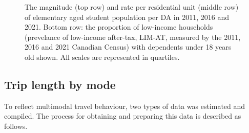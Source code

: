 \documentclass[
default
]{sn-jnl}
\begin{document}
\begin{figure}[H]


\caption{\label{fig-Fig3}The magnitude (top row) and rate per
residential unit (middle row) of elementary aged student population per
DA in 2011, 2016 and 2021. Bottom row: the proportion of low-income
households (prevelance of low-income after-tax, LIM-AT, measured by the
2011, 2016 and 2021 Canadian Census) with dependents under 18 years old
shown. All scales are represented in quartiles.}

\end{figure}%

\subsection{Trip length by mode}\label{trip-length-by-mode}

To reflect multimodal travel behaviour, two types of data was estimated
and compiled. The process for obtaining and preparing this data is
described as follows.
\end{document}
